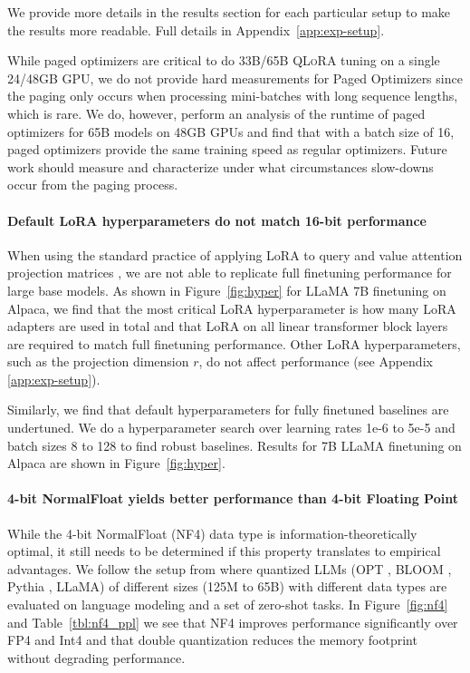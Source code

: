 We provide more details in the results section for each particular setup to make the results more readable. Full details in Appendix~\ref{app:exp-setup}.

While paged optimizers are critical to do 33B/65B \textsc{QLoRA} tuning on a single 24/48GB GPU, we do not provide hard measurements for Paged Optimizers since the paging only occurs when processing mini-batches with long sequence lengths, which is rare. We do, however, perform an analysis of the runtime of paged optimizers for 65B models on 48GB GPUs and find that with a batch size of 16, paged optimizers provide the same training speed as regular optimizers. Future work should measure and characterize under what circumstances slow-downs occur from the paging process.

\paragraph{Default LoRA hyperparameters do not match 16-bit performance} 

When using the standard practice of applying LoRA to query and value attention projection matrices \citep{hu2021lora}, we are not able to replicate full finetuning performance for large base models. As shown in Figure~\ref{fig:hyper} for LLaMA 7B finetuning on Alpaca, we find that the most critical LoRA hyperparameter is how many LoRA adapters are used in total and that LoRA on all linear transformer block layers are required to match full finetuning performance. Other LoRA hyperparameters, such as the projection dimension $r$, do not affect performance (see Appendix \ref{app:exp-setup}). 

Similarly, we find that default hyperparameters for fully finetuned baselines are undertuned. We do a hyperparameter search over learning rates 1e-6 to 5e-5 and batch sizes 8 to 128 to find robust baselines. Results for 7B LLaMA finetuning on Alpaca are shown in Figure~\ref{fig:hyper}.

\paragraph{4-bit NormalFloat yields better performance than 4-bit Floating Point} 

While the 4-bit NormalFloat (NF4) data type is information-theoretically optimal, it still needs to be determined if this property translates to empirical advantages. We follow the setup from \citet{dettmers2022case} where quantized LLMs (OPT \citep{zhang2022opt}, BLOOM \cite{scao2022bloom}, Pythia \cite{biderman2023pythia}, LLaMA) of different sizes (125M to 65B) with different data types are evaluated on language modeling and a set of zero-shot tasks. In Figure~\ref{fig:nf4} and Table~\ref{tbl:nf4_ppl} we see that NF4 improves performance significantly over FP4 and Int4 and that double quantization reduces the memory footprint without degrading performance.

